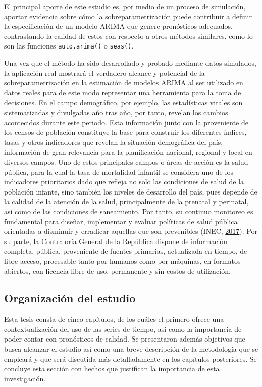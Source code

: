 \documentclass[
]{article}
\begin{document}
El principal aporte de este estudio es, por medio de un proceso de
simulación, aportar evidencia sobre cómo la sobreparametrización puede
contribuir a definir la especificación de un modelo ARIMA que genere
pronósticos adecuados, contrastando la calidad de estos con respecto a
otros métodos similares, como lo son las funciones \texttt{auto.arima()}
o \texttt{seas()}.

Una vez que el método ha sido desarrollado y probado mediante datos
simulados, la aplicación real mostrará el verdadero alcance y potencial
de la sobreparametrización en la estimación de modelos ARIMA al ser
utilizado en datos reales para de este modo representar una herramienta
para la toma de decisiones. En el campo demográfico, por ejemplo, las
estadísticas vitales son sistematizadas y divulgadas año tras año, por
tanto, revelan los cambios acontecidos durante este periodo. Esta
información junto con la proveniente de los censos de población
constituye la base para construir los diferentes índices, tasas y otros
indicadores que revelan la situación demográfica del país, información
de gran relevancia para la planificación nacional, regional y local en
diversos campos. Uno de estos principales campos o áreas de acción es la
salud pública, para la cual la tasa de mortalidad infantil se considera
uno de los indicadores prioritarios dado que refleja no solo las
condiciones de salud de la población infante, sino también los niveles
de desarrollo del país, pues depende de la calidad de la atención de la
salud, principalmente de la prenatal y perinatal, así como de las
condiciones de saneamiento. Por tanto, su continuo monitoreo es
fundamental para diseñar, implementar y evaluar políticas de salud
pública orientadas a disminuir y erradicar aquellas que son prevenibles
(INEC, \protect\hyperlink{ref-calidad_vitales}{2017}). Por su parte, la
Contraloría General de la República dispone de información completa,
pública, proveniente de fuentes primarias, actualizada en tiempo, de
libre acceso, procesable tanto por humanos como por máquinas, en
formatos abiertos, con licencia libre de uso, permanente y sin costos de
utilización.

\subsection{Organización del estudio}

Esta tesis consta de cinco capítulos, de los cuáles el primero ofrece
una contextualización del uso de las series de tiempo, así como la
importancia de poder contar con pronósticos de calidad. Se presentaron
además objetivos que busca alcanzar el estudio así como una breve
descripción de la metodología que se empleará y que será discutida más
detalladamente en los capítulos posteriores. Se concluye esta sección
con hechos que justifican la importancia de esta investigación.
\end{document}
